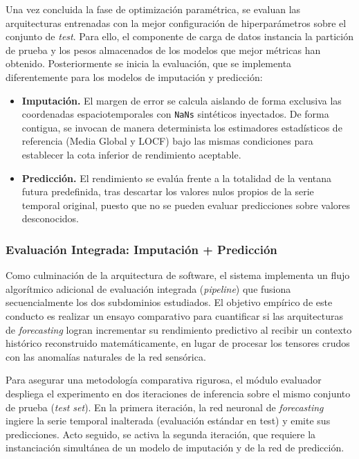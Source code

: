 Una vez concluida la fase de optimización paramétrica, se evaluan las arquitecturas entrenadas con la mejor configuración de hiperparámetros sobre el conjunto de \textit{test}. Para ello, el componente de carga de datos instancia la partición de prueba y los pesos almacenados de los modelos que mejor métricas han obtenido. Posteriormente se inicia la evaluación, que se implementa diferentemente para los modelos de imputación y predicción:

\begin{itemize}
	\item \textbf{Imputación.} El margen de error se calcula aislando de forma exclusiva las coordenadas espaciotemporales con \texttt{NaNs} sintéticos inyectados. De forma contigua, se invocan de manera determinista los estimadores estadísticos de referencia (Media Global y LOCF) bajo las mismas condiciones para establecer la cota inferior de rendimiento aceptable.
	\item \textbf{Predicción.} El rendimiento se evalúa frente a la totalidad de la ventana futura predefinida, tras descartar los valores nulos propios de la serie temporal original, puesto que no se pueden evaluar predicciones sobre valores desconocidos.
\end{itemize}

\subsubsection{Evaluación Integrada: Imputación + Predicción}
Como culminación de la arquitectura de software, el sistema implementa un flujo algorítmico adicional de evaluación integrada (\textit{pipeline}) que fusiona secuencialmente los dos subdominios estudiados. El objetivo empírico de este conducto es realizar un ensayo comparativo para cuantificar si las arquitecturas de \textit{forecasting} logran incrementar su rendimiento predictivo al recibir un contexto histórico reconstruido matemáticamente, en lugar de procesar los tensores crudos con las anomalías naturales de la red sensórica.

Para asegurar una metodología comparativa rigurosa, el módulo evaluador despliega el experimento en dos iteraciones de inferencia sobre el mismo conjunto de prueba (\textit{test set}). En la primera iteración, la red neuronal de \textit{forecasting} ingiere la serie temporal inalterada (evaluación estándar en test) y emite sus predicciones. Acto seguido, se activa la segunda iteración, que requiere la instanciación simultánea de un modelo de imputación y de la red de predicción. 

